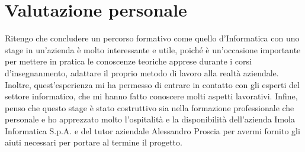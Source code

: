 
\section{Valutazione personale}\label{sec:valutazione-personale}
Ritengo che concludere un percorso formativo come quello d'Informatica con uno stage in un'azienda è molto interessante e utile, poiché è un'occasione importante per mettere in pratica le conoscenze teoriche apprese durante i corsi d'insegnanmento, adattare il proprio metodo di lavoro alla realtà aziendale.\\
Inoltre, quest'esperienza mi ha permesso di entrare in contatto con gli esperti del settore informatico, che mi hanno fatto conoscere molti aspetti lavorativi.
Infine, penso che questo stage è stato costruttivo sia nella formazione professionale che personale e ho apprezzato molto l'ospitalità e la disponibilità dell'azienda Imola Informatica S.p.A. e del tutor aziendale Alessandro Proscia per avermi fornito gli aiuti necessari per portare al termine il progetto.
